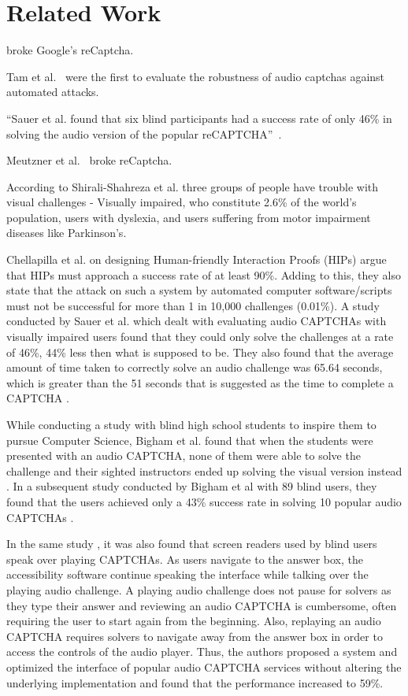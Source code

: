 \section{Related Work}
\label{sec:related}

\cite{sivakorn:eurosp16} broke Google's reCaptcha.

Tam et al.~\cite{tam2008improving} were the first to evaluate the robustness of audio captchas against automated attacks.

``Sauer et al. found that
six blind participants had a success rate of only 46\% in
solving the audio version of the popular reCAPTCHA''~\cite{sauer2008towards}.

Meutzner et al.~\cite{meutzner2014using} broke reCaptcha.

According to Shirali-Shahreza et al. \cite{shirali2011accessibility} three groups of people
have trouble with visual challenges - Visually impaired, who constitute 2.6\% of the world's
population, users with dyslexia, and users suffering from motor impairment diseases like Parkinson's.

Chellapilla et al. \cite{chellapilla2005designing} on designing Human-friendly Interaction Proofs (HIPs)
argue that HIPs must approach a success rate of at least 90\%. Adding to this, they also state that the
attack on such a system by automated computer software/scripts must not be successful for more than 1 in
10,000 challenges (0.01\%). A study conducted by Sauer et al. \cite{sauer2008towards} which dealt with
evaluating audio CAPTCHAs with visually impaired users found that they could only solve the challenges
at a rate of 46\%, 44\% less then what is supposed to be. They also found that the average amount of time
taken to correctly solve an audio challenge was 65.64 seconds, which is greater than the 51 seconds that
is suggested as the time to complete a CAPTCHA \cite{schluessler2007bot}.

While conducting a study with blind high school students to inspire them to pursue Computer Science, Bigham et al.
found that when the students were presented with an audio CAPTCHA, none of them were able to solve the challenge and
their sighted instructors ended up solving the visual version instead \cite{bigham2008inspiring}. In a subsequent
study conducted by Bigham et al with 89 blind users, they found that the users achieved only a 43\% success rate in
solving 10 popular audio CAPTCHAs \cite{bigham2009evaluating}. 

In the same study \cite{bigham2009evaluating}, it was also found that screen readers used by blind users speak over
playing CAPTCHAs. As users navigate to the answer box, the accessibility software continue speaking the interface while
talking over the playing audio challenge. A playing audio challenge does not pause for solvers as they type their answer
and reviewing an audio CAPTCHA is cumbersome, often requiring the user to start again from the beginning. Also, replaying
an audio CAPTCHA requires solvers to navigate away from the answer box in order to access the controls of the audio player.
Thus, the authors proposed a system and optimized the interface of popular audio CAPTCHA services without altering the
underlying implementation and found that the performance increased to 59\%. 
